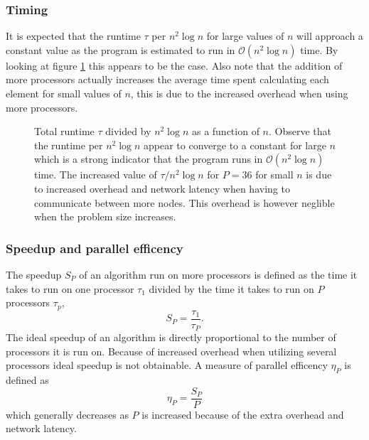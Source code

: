 \documentclass[11pt,a4paper,english]{article}
\numberwithin{figure}{subsection}
\numberwithin{table}{subsection}
\begin{document}
\subsubsection{Timing}

It is expected that the runtime $\tau$ per $n^2\log n$ for large values of $n$ will approach a constant value as the program is estimated to run in $\mathcal{O}(n^2\log n)$ time. By looking at figure \ref{fig:time1} this appears to be the case. Also note that the addition of more processors actually increases the average time spent calculating each element for small values of $n$, this is due to the increased overhead when using more processors.

\begin{figure}[tbp]
	\centering
	
	\caption{Total runtime $\tau$ divided by $n^2\log n$ as a function of $n$. Observe that the runtime per $n^2\log n$ appear to converge to a constant for large $n$ which is a strong indicator that the program runs in $\mathcal{O}(n^2 \log n)$ time. The increased value of $\tau /n^2\log n$ for $P=36$ for small $n$ is due to increased overhead and network latency when having to communicate between more nodes. This overhead is however neglible when the problem size increases.}
	\label{fig:time1}
\end{figure}

\subsubsection{Speedup and parallel efficency}
The speedup $S_P$ of an algorithm run on more processors is defined as the time it takes to run on one processor $\tau_1$ divided by the time it takes to run on $P$ processors $\tau_p$,
\begin{equation}
	S_P = \frac{\tau_1}{\tau_P}.
\end{equation}
The ideal speedup of an algorithm is directly proportional to the number of processors it is run on. Because of increased overhead when utilizing several processors ideal speedup is not obtainable. A measure of parallel efficency $\eta_P$ is defined as
\begin{equation}
	\eta_P = \frac{S_P}{P}
\end{equation}
which generally decreases as $P$ is increased because of the extra overhead and network latency.
\end{document}
